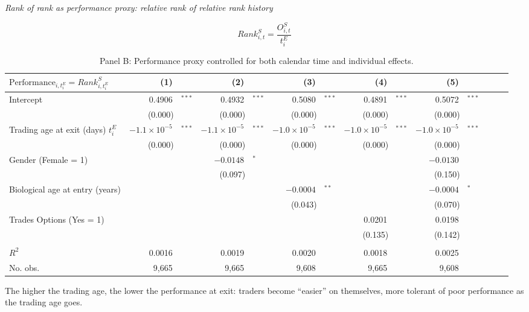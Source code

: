 \documentclass{beamer}
\begin{document}
\begin{frame}{}

{\em Rank of rank as performance proxy: relative rank of  relative rank history}

$$
Rank^S_{i, t} = \frac{O^S_{i,t}}{t^E_i}
$$
	\begin{table}[h!]
		\centering
		\caption{Panel B: Performance proxy controlled for both calendar time and individual effects.}
		\tiny
		\setlength{\tabcolsep}{0.1pt}
		\begin{tabular}{@{}l@{}r@{}lr@{}lr@{}lr@{}lr@{}lr@{}l@{}l}
		\toprule
		$\text{Performance}_{i, t^E_i}  = Rank^S_{i,t^E_i}$ & (1)   &       & (2)   &       & (3)   &       & (4)   &       & (5)   &  \\
		\midrule
		Intercept & 0.4906 & $^{***}$   & 0.4932 & $^{***}$   & 0.5080 & $^{***}$   & 0.4891 & $^{***}$   & 0.5072 & $^{***}$ \\
		& \multicolumn{2}{c}{(0.000)} & \multicolumn{2}{c}{(0.000)} & \multicolumn{2}{c}{(0.000)} & \multicolumn{2}{c}{(0.000)} & \multicolumn{2}{c}{(0.000)} \\
		Trading age at exit (days) $t^E_i$ & $-1.1\times 10^{-5}$ & $^{***}$   & $-1.1\times 10^{-5}$ & $^{***}$   & $-1.0\times 10^{-5}$ & $^{***}$   & $-1.0\times 10^{-5}$ & $^{***}$   & $-1.0\times 10^{-5}$ & $^{***}$ \\
		& \multicolumn{2}{c}{(0.000)} & \multicolumn{2}{c}{(0.000)} & \multicolumn{2}{c}{(0.000)} & \multicolumn{2}{c}{(0.000)} & \multicolumn{2}{c}{(0.000)} \\
		Gender (Female = 1) &       &       & $-0.0148$ & $^{*}$     &       &       &       &       & $-0.0130$ &  \\
		& \multicolumn{2}{r}{} & \multicolumn{2}{c}{(0.097)} & \multicolumn{2}{r}{} & \multicolumn{2}{r}{} & \multicolumn{2}{c}{(0.150)} \\
		Biological age at entry (years) &       &       &       &       & $-0.0004$ & $^{**}$    &       &       & $-0.0004$ & $^{*}$ \\
		& \multicolumn{2}{r}{} & \multicolumn{2}{r}{} & \multicolumn{2}{c}{(0.043)} & \multicolumn{2}{r}{} & \multicolumn{2}{c}{(0.070)} \\
		Trades Options (Yes = 1) &       &       &       &       &       &       & 0.0201 &       & 0.0198 &  \\
		& \multicolumn{2}{r}{} & \multicolumn{2}{r}{} & \multicolumn{2}{r}{} & \multicolumn{2}{c}{(0.135)} & \multicolumn{2}{c}{(0.142)} \\
		&       &       &       &       &       &       &       &       &       &  \\
		$R^2$  & 0.0016 &       & 0.0019 &       & 0.0020 &       & 0.0018 &       & 0.0025 &  \\
		No. obs.   & 9,665  &       & 9,665  &       & 9,608  &       & 9,665  &       & 9,608  &  \\
		\bottomrule
	\end{tabular}
	\label{tab:ols}
\end{table}

The higher the trading age, the lower the performance at exit: traders become ``easier''  on themselves, more tolerant of poor performance as the trading age goes.
\end{frame}
\end{document}
